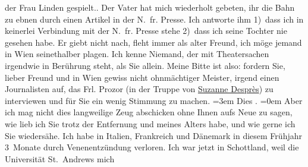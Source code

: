 \begin{ledgroupsized}[t]{13cm}
{{{                  der Frau Linden
                  gespielt.}}}\label{K_L02033_1h}. Der Vater
               hat mich wiederholt gebeten, ihr die Bahn zu ebnen durch einen Artikel in der N. fr. Presse. Ich antworte ihm 1) dass ich in
               keinerlei Verbindung mit der N. fr. Presse stehe
               2) dass ich seine Tochter nie
               gesehen habe.\pend
           \pstart
           Er giebt nicht nach, fleht immer als alter Freund, ich möge jemand in Wien seinet{\pb}halber plagen.\pend
           \pstart
           Ich kenne Niemand, der mit Theatersachen irgendwie in Berührung steht, als Sie
               allein.\pend
           \pstart
           Meine Bitte ist also: fordern Sie, lieber Freund und in Wien gewiss nicht ohnmächtiger Meister, irgend einen Journalisten auf, das
               Frl. Prozor (in der Truppe von \uline{Suzanne Desprès}) zu interviewen und für Sie ein wenig Stimmung zu machen.\pend
           \leftskip=3em{}\pstart
           \noindent{}Dies \label{K_L02033_2v}\label{K_L02033_2h}.\pend
           \leftskip=0em{}\pstart
           \noindent{}Aber ich mag nicht dies langweilige Zeug abschicken ohne Ihnen aufs Neue zu sagen,
               wie lieb ich Sie trotz der Entfernung und meines Alters habe, und wie gerne ich Sie
               wiedersähe.\pend
           \pstart
           Ich habe in Italien, Frankreich und Dänemark in diesem
               Frühjahr 3 Monate durch Venenentzündung verloren. Ich war jetzt in {\pb}Schottland, weil die Universität St. Andrews mich \label{K_L02033_3v}
\end{ledgroupsized}

